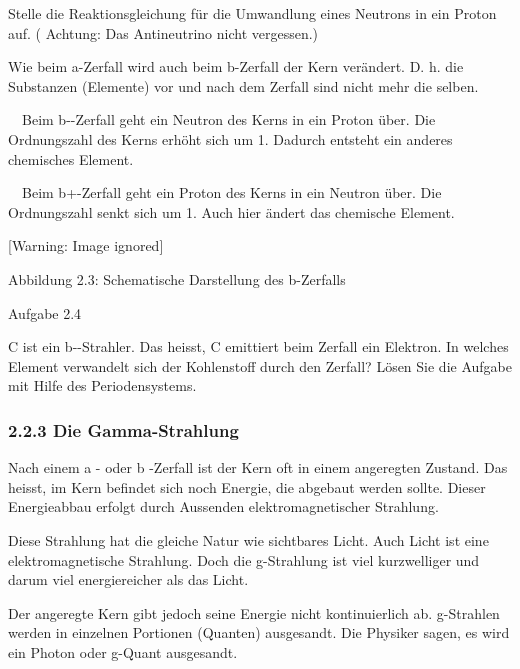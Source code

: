 \documentclass[12pt,a4paper,twoside]{article}
\begin{document}
Stelle die Reaktionsgleichung für die Umwandlung eines Neutrons in ein Proton auf. ( Achtung: Das Antineutrino nicht vergessen.)


\bigskip

Wie beim \textgreek{a}\nobreakdash-Zerfall wird auch beim \textgreek{b}\nobreakdash-Zerfall der Kern verändert. D. h. die Substanzen (Elemente) vor und nach dem Zerfall sind nicht mehr die selben.

{\textbullet}\ \ Beim \textgreek{b}\nobreakdash-\nobreakdash-Zerfall geht ein Neutron des Kerns in ein Proton über. Die Ordnungszahl des Kerns erhöht sich um 1. Dadurch entsteht ein anderes chemisches Element.

{\textbullet}\ \ Beim \textgreek{b}+\nobreakdash-Zerfall geht ein Proton des Kerns in ein Neutron über. Die Ordnungszahl senkt sich um 1. Auch hier ändert das chemische Element.

  [Warning: Image ignored] %
 

Abbildung 2.3: Schematische Darstellung des b\nobreakdash-Zerfalls

Aufgabe 2.4

C ist ein \textgreek{b}\nobreakdash-\nobreakdash-Strahler. Das heisst, C emittiert beim Zerfall ein Elektron. In welches Element verwandelt sich der Kohlenstoff durch den Zerfall? Lösen Sie die Aufgabe mit Hilfe des Periodensystems. 


\bigskip

\subsubsection[2.2.3 Die Gamma\nobreakdash-Strahlung]{2.2.3 Die Gamma\nobreakdash-Strahlung}
Nach einem \textgreek{a} \nobreakdash- oder \textgreek{b} \nobreakdash-Zerfall ist der Kern oft in einem angeregten Zustand. Das heisst, im Kern befindet sich noch Energie, die abgebaut werden sollte. Dieser Energieabbau erfolgt durch Aussenden elektromagnetischer Strahlung.

Diese Strahlung hat die gleiche Natur wie sichtbares Licht. Auch Licht ist eine elektromagnetische Strahlung. Doch die \textgreek{g}\nobreakdash-Strahlung ist viel kurzwelliger und darum viel energiereicher als das Licht.

Der angeregte Kern gibt jedoch seine Energie nicht kontinuierlich ab. \textgreek{g}\nobreakdash-Strahlen werden in einzelnen Portionen (Quanten) ausgesandt. Die Physiker sagen, es wird ein Photon oder \textgreek{g}\nobreakdash-Quant ausgesandt.
\end{document}
